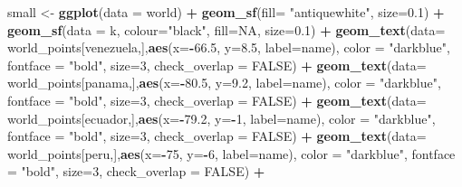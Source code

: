 \documentclass[12pt,twoside]{reedthesis}
\newenvironment{Shaded}{\begin{snugshade}}{\end{snugshade}}
\newcommand{\DataTypeTok}[1]{\textcolor[rgb]{0.13,0.29,0.53}{#1}}
\newcommand{\DecValTok}[1]{\textcolor[rgb]{0.00,0.00,0.81}{#1}}
\newcommand{\FloatTok}[1]{\textcolor[rgb]{0.00,0.00,0.81}{#1}}
\newcommand{\KeywordTok}[1]{\textcolor[rgb]{0.13,0.29,0.53}{\textbf{#1}}}
\newcommand{\NormalTok}[1]{#1}
\newcommand{\OperatorTok}[1]{\textcolor[rgb]{0.81,0.36,0.00}{\textbf{#1}}}
\newcommand{\OtherTok}[1]{\textcolor[rgb]{0.56,0.35,0.01}{#1}}
\newcommand{\StringTok}[1]{\textcolor[rgb]{0.31,0.60,0.02}{#1}}
\begin{document}
\begin{Shaded}
\begin{Highlighting}[]
{{{{\NormalTok{small <-}\StringTok{ }\KeywordTok{ggplot}\NormalTok{(}\DataTypeTok{data =}\NormalTok{ world) }\OperatorTok{+}\StringTok{ }
\StringTok{  }\KeywordTok{geom_sf}\NormalTok{(}\DataTypeTok{fill=} \StringTok{"antiquewhite"}\NormalTok{,  }\DataTypeTok{size=}\FloatTok{0.1}\NormalTok{) }\OperatorTok{+}\StringTok{ }
\StringTok{  }\KeywordTok{geom_sf}\NormalTok{(}\DataTypeTok{data =}\NormalTok{ k, }\DataTypeTok{colour=}\StringTok{"black"}\NormalTok{, }\DataTypeTok{fill=}\OtherTok{NA}\NormalTok{, }\DataTypeTok{size=}\FloatTok{0.1}\NormalTok{) }\OperatorTok{+}\StringTok{ }
\StringTok{  }\KeywordTok{geom_text}\NormalTok{(}\DataTypeTok{data=}\NormalTok{ world_points[venezuela,],}\KeywordTok{aes}\NormalTok{(}\DataTypeTok{x=}\OperatorTok{-}\FloatTok{66.5}\NormalTok{, }\DataTypeTok{y=}\FloatTok{8.5}\NormalTok{, }\DataTypeTok{label=}\NormalTok{name), }\DataTypeTok{color =} \StringTok{"darkblue"}\NormalTok{, }\DataTypeTok{fontface =} \StringTok{"bold"}\NormalTok{, }\DataTypeTok{size=}\DecValTok{3}\NormalTok{, }\DataTypeTok{check_overlap =} \OtherTok{FALSE}\NormalTok{) }\OperatorTok{+}
\StringTok{  }\KeywordTok{geom_text}\NormalTok{(}\DataTypeTok{data=}\NormalTok{ world_points[panama,],}\KeywordTok{aes}\NormalTok{(}\DataTypeTok{x=}\OperatorTok{-}\FloatTok{80.5}\NormalTok{, }\DataTypeTok{y=}\FloatTok{9.2}\NormalTok{, }\DataTypeTok{label=}\NormalTok{name), }\DataTypeTok{color =} \StringTok{"darkblue"}\NormalTok{, }\DataTypeTok{fontface =} \StringTok{"bold"}\NormalTok{, }\DataTypeTok{size=}\DecValTok{3}\NormalTok{, }\DataTypeTok{check_overlap =} \OtherTok{FALSE}\NormalTok{) }\OperatorTok{+}\StringTok{ }
\StringTok{  }\KeywordTok{geom_text}\NormalTok{(}\DataTypeTok{data=}\NormalTok{ world_points[ecuador,],}\KeywordTok{aes}\NormalTok{(}\DataTypeTok{x=}\OperatorTok{-}\FloatTok{79.2}\NormalTok{, }\DataTypeTok{y=}\OperatorTok{-}\DecValTok{1}\NormalTok{, }\DataTypeTok{label=}\NormalTok{name), }\DataTypeTok{color =} \StringTok{"darkblue"}\NormalTok{, }\DataTypeTok{fontface =} \StringTok{"bold"}\NormalTok{, }\DataTypeTok{size=}\DecValTok{3}\NormalTok{, }\DataTypeTok{check_overlap =} \OtherTok{FALSE}\NormalTok{) }\OperatorTok{+}
\StringTok{  }\KeywordTok{geom_text}\NormalTok{(}\DataTypeTok{data=}\NormalTok{ world_points[peru,],}\KeywordTok{aes}\NormalTok{(}\DataTypeTok{x=}\OperatorTok{-}\DecValTok{75}\NormalTok{, }\DataTypeTok{y=}\OperatorTok{-}\DecValTok{6}\NormalTok{, }\DataTypeTok{label=}\NormalTok{name), }\DataTypeTok{color =} \StringTok{"darkblue"}\NormalTok{, }\DataTypeTok{fontface =} \StringTok{"bold"}\NormalTok{, }\DataTypeTok{size=}\DecValTok{3}\NormalTok{, }\DataTypeTok{check_overlap =} \OtherTok{FALSE}\NormalTok{) }\OperatorTok{+}
}}}}
\end{Highlighting}
\end{Shaded}
\end{document}
